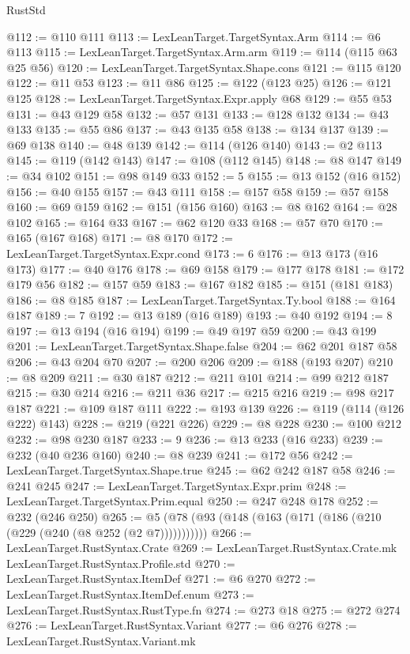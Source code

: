 \begin{lexlean}{RustStd}
\begin{coremodule}
{\begin{coremodule}
{{{{{{{{{{{{{{@112 := @110 @111
@113 := LexLeanTarget.TargetSyntax.Arm
@114 := @6 @113
@115 := LexLeanTarget.TargetSyntax.Arm.arm
@119 := @114 (@115 @63 @25 @56)
@120 := LexLeanTarget.TargetSyntax.Shape.cons
@121 := @115 @120
@122 := @11 @53
@123 := @11 @86
@125 := @122 (@123 @25)
@126 := @121 @125
@128 := LexLeanTarget.TargetSyntax.Expr.apply @68
@129 := @55 @53
@131 := @43 @129 @58
@132 := @57 @131
@133 := @128 @132
@134 := @43 @133
@135 := @55 @86
@137 := @43 @135 @58
@138 := @134 @137
@139 := @69 @138
@140 := @48 @139
@142 := @114 (@126 @140)
@143 := @2 @113
@145 := @119 (@142 @143)
@147 := @108 (@112 @145)
@148 := @8 @147
@149 := @34 @102
@151 := @98 @149 @33
@152 := 5
@155 := @13 @152 (@16 @152)
@156 := @40 @155
@157 := @43 @111
@158 := @157 @58
@159 := @57 @158
@160 := @69 @159
@162 := @151 (@156 @160)
@163 := @8 @162
@164 := @28 @102
@165 := @164 @33
@167 := @62 @120 @33
@168 := @57 @70
@170 := @165 (@167 @168)
@171 := @8 @170
@172 := LexLeanTarget.TargetSyntax.Expr.cond
@173 := 6
@176 := @13 @173 (@16 @173)
@177 := @40 @176
@178 := @69 @158
@179 := @177 @178
@181 := @172 @179 @56
@182 := @157 @59
@183 := @167 @182
@185 := @151 (@181 @183)
@186 := @8 @185
@187 := LexLeanTarget.TargetSyntax.Ty.bool
@188 := @164 @187
@189 := 7
@192 := @13 @189 (@16 @189)
@193 := @40 @192
@194 := 8
@197 := @13 @194 (@16 @194)
@199 := @49 @197 @59
@200 := @43 @199
@201 := LexLeanTarget.TargetSyntax.Shape.false
@204 := @62 @201 @187 @58
@206 := @43 @204 @70
@207 := @200 @206
@209 := @188 (@193 @207)
@210 := @8 @209
@211 := @30 @187
@212 := @211 @101
@214 := @99 @212 @187
@215 := @30 @214
@216 := @211 @36
@217 := @215 @216
@219 := @98 @217 @187
@221 := @109 @187 @111
@222 := @193 @139
@226 := @119 (@114 (@126 @222) @143)
@228 := @219 (@221 @226)
@229 := @8 @228
@230 := @100 @212
@232 := @98 @230 @187
@233 := 9
@236 := @13 @233 (@16 @233)
@239 := @232 (@40 @236 @160)
@240 := @8 @239
@241 := @172 @56
@242 := LexLeanTarget.TargetSyntax.Shape.true
@245 := @62 @242 @187 @58
@246 := @241 @245
@247 := LexLeanTarget.TargetSyntax.Expr.prim
@248 := LexLeanTarget.TargetSyntax.Prim.equal
@250 := @247 @248 @178
@252 := @232 (@246 @250)
@265 := @5 (@78 (@93 (@148 (@163 (@171 (@186 (@210 (@229 (@240 (@8 @252 (@2 @7)))))))))))
@266 := LexLeanTarget.RustSyntax.Crate
@269 := LexLeanTarget.RustSyntax.Crate.mk LexLeanTarget.RustSyntax.Profile.std
@270 := LexLeanTarget.RustSyntax.ItemDef
@271 := @6 @270
@272 := LexLeanTarget.RustSyntax.ItemDef.enum
@273 := LexLeanTarget.RustSyntax.RustType.fn
@274 := @273 @18
@275 := @272 @274
@276 := LexLeanTarget.RustSyntax.Variant
@277 := @6 @276
@278 := LexLeanTarget.RustSyntax.Variant.mk
}}}}}}}}}}}}}}
\end{coremodule}}
\end{coremodule}
\end{lexlean}

